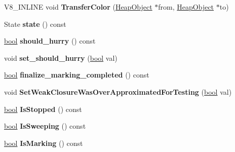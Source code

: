 \begin{DoxyCompactItemize}
V8\+\_\+\+I\+N\+L\+I\+NE void {\bfseries Transfer\+Color} (\mbox{\hyperlink{classv8_1_1internal_1_1HeapObject}{Heap\+Object}} $\ast$from, \mbox{\hyperlink{classv8_1_1internal_1_1HeapObject}{Heap\+Object}} $\ast$to)
\item 
\mbox{\label{classv8_1_1internal_1_1IncrementalMarking_ab74af7e0b442bcfdbcbd59e465269bed}} 
State {\bfseries state} () const
\item 
\mbox{\label{classv8_1_1internal_1_1IncrementalMarking_a2289fcadcc288b4b8e30dd7e083dba1e}} 
\mbox{\hyperlink{classbool}{bool}} {\bfseries should\+\_\+hurry} () const
\item 
\mbox{\label{classv8_1_1internal_1_1IncrementalMarking_a9eafdc076169d642d57722f6ace91299}} 
void {\bfseries set\+\_\+should\+\_\+hurry} (\mbox{\hyperlink{classbool}{bool}} val)
\item 
\mbox{\label{classv8_1_1internal_1_1IncrementalMarking_afb4c217e2cfd2abc1896a17dfb084223}} 
\mbox{\hyperlink{classbool}{bool}} {\bfseries finalize\+\_\+marking\+\_\+completed} () const
\item 
\mbox{\label{classv8_1_1internal_1_1IncrementalMarking_ae266e583cd45869e2670df0f186bc3fd}} 
void {\bfseries Set\+Weak\+Closure\+Was\+Over\+Approximated\+For\+Testing} (\mbox{\hyperlink{classbool}{bool}} val)
\item 
\mbox{\label{classv8_1_1internal_1_1IncrementalMarking_a421afcfedbad9dba889295ea646625fa}} 
\mbox{\hyperlink{classbool}{bool}} {\bfseries Is\+Stopped} () const
\item 
\mbox{\label{classv8_1_1internal_1_1IncrementalMarking_a932574e7b53a0d325f3aff012d6c7aa0}} 
\mbox{\hyperlink{classbool}{bool}} {\bfseries Is\+Sweeping} () const
\item 
\mbox{\label{classv8_1_1internal_1_1IncrementalMarking_a36f76d27a7a670a4b270804cef79cea1}} 
\mbox{\hyperlink{classbool}{bool}} {\bfseries Is\+Marking} () const

\end{DoxyCompactItemize}
